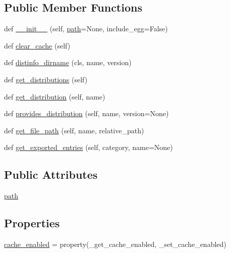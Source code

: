 \subsection*{Public Member Functions}
\begin{DoxyCompactItemize}
\item 
def \hyperlink{classpip_1_1__vendor_1_1distlib_1_1database_1_1DistributionPath_a17a2afe7db83a808ad93c909d99ed955}{\+\_\+\+\_\+init\+\_\+\+\_\+} (self, \hyperlink{classpip_1_1__vendor_1_1distlib_1_1database_1_1DistributionPath_af45026e55efb1a3e265aa4eb5b4ca5c7}{path}=None, include\+\_\+egg=False)
\item 
def \hyperlink{classpip_1_1__vendor_1_1distlib_1_1database_1_1DistributionPath_a576c17cc01238d807b4cc7b833001b0b}{clear\+\_\+cache} (self)
\item 
def \hyperlink{classpip_1_1__vendor_1_1distlib_1_1database_1_1DistributionPath_a1500e9cf278065339a256b7a18a26aa1}{distinfo\+\_\+dirname} (cls, name, version)
\item 
def \hyperlink{classpip_1_1__vendor_1_1distlib_1_1database_1_1DistributionPath_a7648bdf2f1bf2a7e9f9e55aea3e1b1b3}{get\+\_\+distributions} (self)
\item 
def \hyperlink{classpip_1_1__vendor_1_1distlib_1_1database_1_1DistributionPath_af76df55542d7cd100793ca54b893c808}{get\+\_\+distribution} (self, name)
\item 
def \hyperlink{classpip_1_1__vendor_1_1distlib_1_1database_1_1DistributionPath_a149d6da691331a1302cad987fd42d23e}{provides\+\_\+distribution} (self, name, version=None)
\item 
def \hyperlink{classpip_1_1__vendor_1_1distlib_1_1database_1_1DistributionPath_aad37e3c8f1659cb307dcd5472a563f96}{get\+\_\+file\+\_\+path} (self, name, relative\+\_\+path)
\item 
def \hyperlink{classpip_1_1__vendor_1_1distlib_1_1database_1_1DistributionPath_a69e5ea3ce433f4ff77e0fae760f09605}{get\+\_\+exported\+\_\+entries} (self, category, name=None)
\end{DoxyCompactItemize}
\subsection*{Public Attributes}
\begin{DoxyCompactItemize}
\item 
\hyperlink{classpip_1_1__vendor_1_1distlib_1_1database_1_1DistributionPath_af45026e55efb1a3e265aa4eb5b4ca5c7}{path}
\end{DoxyCompactItemize}
\subsection*{Properties}
\begin{DoxyCompactItemize}
\item 
\hyperlink{classpip_1_1__vendor_1_1distlib_1_1database_1_1DistributionPath_ad4ec28f31f9d2152d69afda83c18bda8}{cache\+\_\+enabled} = property(\+\_\+get\+\_\+cache\+\_\+enabled, \+\_\+set\+\_\+cache\+\_\+enabled)
\end{DoxyCompactItemize}


